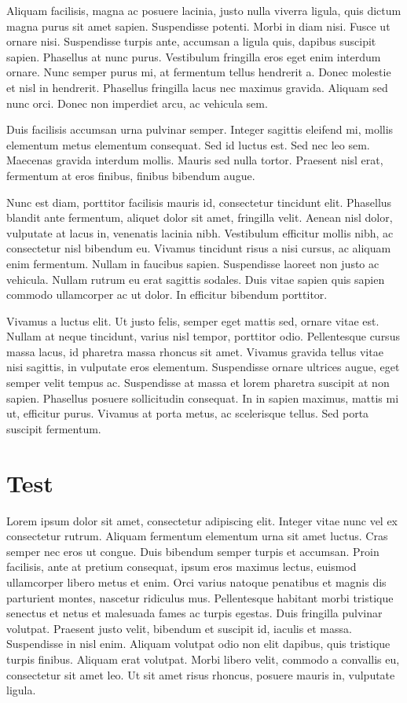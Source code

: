 \documentclass[12pt,a4paper,twoside]{book}
\begin{document}
Aliquam facilisis, magna ac posuere lacinia, justo nulla viverra ligula, quis dictum magna purus sit amet sapien. Suspendisse potenti. Morbi in diam nisi. Fusce ut ornare nisi. Suspendisse turpis ante, accumsan a ligula quis, dapibus suscipit sapien. Phasellus at nunc purus. Vestibulum fringilla eros eget enim interdum ornare. Nunc semper purus mi, at fermentum tellus hendrerit a. Donec molestie et nisl in hendrerit. Phasellus fringilla lacus nec maximus gravida. Aliquam sed nunc orci. Donec non imperdiet arcu, ac vehicula sem.

Duis facilisis accumsan urna pulvinar semper. Integer sagittis eleifend mi, mollis elementum metus elementum consequat. Sed id luctus est. Sed nec leo sem. Maecenas gravida interdum mollis. Mauris sed nulla tortor. Praesent nisl erat, fermentum at eros finibus, finibus bibendum augue.

Nunc est diam, porttitor facilisis mauris id, consectetur tincidunt elit. Phasellus blandit ante fermentum, aliquet dolor sit amet, fringilla velit. Aenean nisl dolor, vulputate at lacus in, venenatis lacinia nibh. Vestibulum efficitur mollis nibh, ac consectetur nisl bibendum eu. Vivamus tincidunt risus a nisi cursus, ac aliquam enim fermentum. Nullam in faucibus sapien. Suspendisse laoreet non justo ac vehicula. Nullam rutrum eu erat sagittis sodales. Duis vitae sapien quis sapien commodo ullamcorper ac ut dolor. In efficitur bibendum porttitor.

Vivamus a luctus elit. Ut justo felis, semper eget mattis sed, ornare vitae est. Nullam at neque tincidunt, varius nisl tempor, porttitor odio. Pellentesque cursus massa lacus, id pharetra massa rhoncus sit amet. Vivamus gravida tellus vitae nisi sagittis, in vulputate eros elementum. Suspendisse ornare ultrices augue, eget semper velit tempus ac. Suspendisse at massa et lorem pharetra suscipit at non sapien. Phasellus posuere sollicitudin consequat. In in sapien maximus, mattis mi ut, efficitur purus. Vivamus at porta metus, ac scelerisque tellus. Sed porta suscipit fermentum.
\section{Test}
Lorem ipsum dolor sit amet, consectetur adipiscing elit. Integer vitae nunc vel ex consectetur rutrum. Aliquam fermentum elementum urna sit amet luctus. Cras semper nec eros ut congue. Duis bibendum semper turpis et accumsan. Proin facilisis, ante at pretium consequat, ipsum eros maximus lectus, euismod ullamcorper libero metus et enim. Orci varius natoque penatibus et magnis dis parturient montes, nascetur ridiculus mus. Pellentesque habitant morbi tristique senectus et netus et malesuada fames ac turpis egestas. Duis fringilla pulvinar volutpat. Praesent justo velit, bibendum et suscipit id, iaculis et massa. Suspendisse in nisl enim. Aliquam volutpat odio non elit dapibus, quis tristique turpis finibus. Aliquam erat volutpat. Morbi libero velit, commodo a convallis eu, consectetur sit amet leo. Ut sit amet risus rhoncus, posuere mauris in, vulputate ligula.
\end{document}
